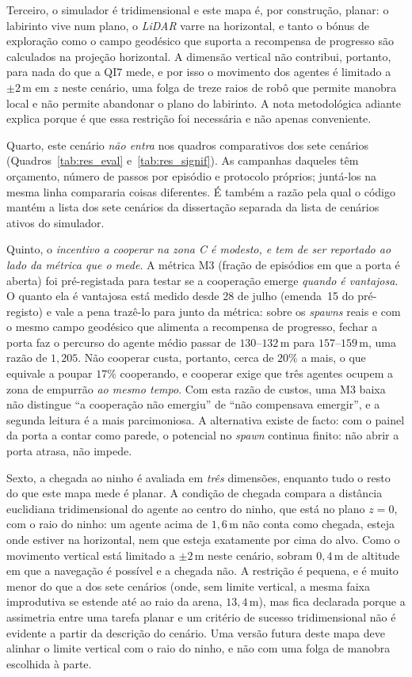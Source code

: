 Terceiro, o simulador é tridimensional e este mapa é, por construção, planar: o
labirinto vive num plano, o \textit{LiDAR} varre na horizontal, e tanto o bónus de
exploração como o campo geodésico que suporta a recompensa de progresso são
calculados na projeção horizontal. A dimensão vertical não contribui, portanto,
para nada do que a QI7 mede, e por isso o movimento dos agentes é limitado a
$\pm 2$\,m em $z$ neste cenário, uma folga de treze raios de robô que permite
manobra local e não permite abandonar o plano do labirinto. A nota metodológica
adiante explica porque é que essa restrição foi necessária e não apenas
conveniente.

Quarto, este cenário \emph{não entra} nos quadros comparativos dos sete
cenários (Quadros~\ref{tab:res_eval} e~\ref{tab:res_signif}). As campanhas
daqueles têm orçamento, número de passos por episódio e protocolo próprios;
juntá-los na mesma linha compararia coisas diferentes. É também a razão pela qual
o código mantém a lista dos sete cenários da dissertação separada da lista de
cenários ativos do simulador.

Quinto, o \emph{incentivo a cooperar na zona C é modesto, e tem de ser
reportado ao lado da métrica que o mede}. A métrica M3 (fração de episódios em
que a porta é aberta) foi pré-registada para testar se a cooperação emerge
\emph{quando é vantajosa}. O quanto ela é vantajosa está medido desde 28 de julho
(emenda~15 do pré-registo) e vale a pena trazê-lo para junto da métrica: sobre os
\textit{spawns} reais e com o mesmo campo geodésico que alimenta a recompensa de
progresso, fechar a porta faz o percurso do agente médio passar de $130$--$132$\,m para
$157$--$159$\,m, uma razão de $1{,}205$. Não cooperar custa, portanto, cerca de
$20\%$ a mais, o que equivale a poupar $17\%$ cooperando, e cooperar exige que
três agentes ocupem a zona de empurrão \emph{ao mesmo tempo}. Com esta razão de
custos, uma M3 baixa não distingue ``a cooperação não emergiu'' de ``não
compensava emergir'', e a segunda leitura é a mais parcimoniosa. A alternativa
existe de facto: com o painel da porta a contar como parede, o potencial no
\textit{spawn} continua finito: não abrir a porta atrasa, não impede.

Sexto, a chegada ao ninho é avaliada em \emph{três} dimensões, enquanto tudo o
resto do que este mapa mede é planar. A condição de chegada compara a distância
euclidiana tridimensional do agente ao centro do ninho, que está no plano
$z = 0$, com o raio do ninho: um agente acima de $1{,}6$\,m não conta como chegada, esteja
onde estiver na horizontal, nem que esteja exatamente por cima do alvo. Como o
movimento vertical está limitado a $\pm 2$\,m neste cenário, sobram $0{,}4$\,m de
altitude em que a navegação é possível e a chegada não. A restrição é pequena, e
é muito menor do que a dos sete cenários (onde, sem limite vertical, a mesma
faixa improdutiva se estende até ao raio da arena, $13{,}4$\,m), mas fica
declarada porque a assimetria entre uma tarefa planar e um critério de sucesso
tridimensional não é evidente a partir da descrição do cenário. Uma versão futura
deste mapa deve alinhar o limite vertical com o raio do ninho, e não com uma
folga de manobra escolhida à parte.

